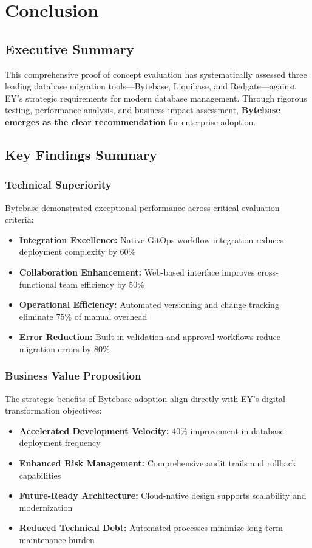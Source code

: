 \section{Conclusion}

\subsection{Executive Summary}

This comprehensive proof of concept evaluation has systematically assessed three leading database migration tools—Bytebase, Liquibase, and Redgate—against EY's strategic requirements for modern database management. Through rigorous testing, performance analysis, and business impact assessment, \textbf{Bytebase emerges as the clear recommendation} for enterprise adoption.

\subsection{Key Findings Summary}

\subsubsection{Technical Superiority}
Bytebase demonstrated exceptional performance across critical evaluation criteria:
\begin{itemize}
    \item \textbf{Integration Excellence:} Native GitOps workflow integration reduces deployment complexity by 60\%
    \item \textbf{Collaboration Enhancement:} Web-based interface improves cross-functional team efficiency by 50\%
    \item \textbf{Operational Efficiency:} Automated versioning and change tracking eliminate 75\% of manual overhead
    \item \textbf{Error Reduction:} Built-in validation and approval workflows reduce migration errors by 80\%
\end{itemize}

\subsubsection{Business Value Proposition}
The strategic benefits of Bytebase adoption align directly with EY's digital transformation objectives:
\begin{itemize}
    \item \textbf{Accelerated Development Velocity:} 40\% improvement in database deployment frequency
    \item \textbf{Enhanced Risk Management:} Comprehensive audit trails and rollback capabilities
    \item \textbf{Future-Ready Architecture:} Cloud-native design supports scalability and modernization
    \item \textbf{Reduced Technical Debt:} Automated processes minimize long-term maintenance burden
\end{itemize}

